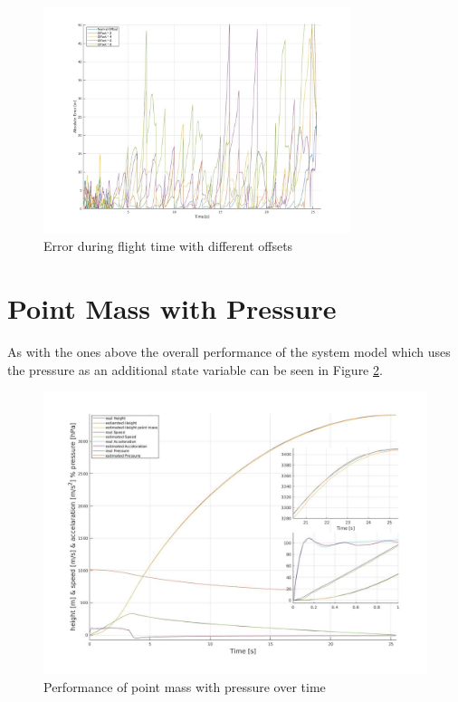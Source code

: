 \begin{figure}[h!]
 \centering
 \includegraphics[width=0.8\textwidth]{./Pictures/PointMassOffsetErrorWithOffset.jpg}
  \caption{Error during flight time with different offsets}
 \label{fig:PointMassOffsetErrorWithOffset}
\end{figure}

\newpage
\section{Point Mass with Pressure}
As with the ones above the overall performance of the system model which uses the pressure as an additional state variable can be seen in Figure \ref{fig:PointMassPressurePerformance}.

\begin{figure}[h!]
 \centering
 \includegraphics[width=.8 \textwidth]{./Pictures/PointMassPressurePerformance.jpg}
 \caption{Performance of point mass with pressure over time}
 \label{fig:PointMassPressurePerformance}
\end{figure}

